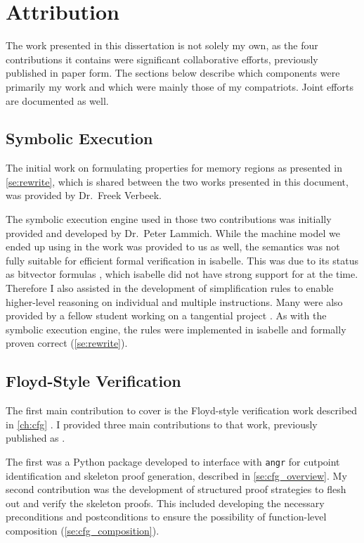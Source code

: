 \chapter{Attribution}\label{attribution}
The work presented in this dissertation is not solely my own,
as the four contributions it contains were significant collaborative efforts, previously published in paper form.
The sections below describe which components were primarily my work
and which were mainly those of my compatriots.
Joint efforts are documented as well.

\section*{Symbolic Execution}
The initial work on formulating properties for memory regions
as presented in \cref{se:rewrite},
which is shared between the two works presented in this document,
was provided by Dr.~Freek Verbeek.

The symbolic execution engine used in those two contributions was initially provided and developed by Dr.~Peter Lammich.
While the machine model we ended up using in the work was provided to us as well,
the semantics was not fully suitable for efficient formal verification in \gls{isabelle}.
This was due to its status as bitvector formulas \autocite{roessle2019verified}, which \gls{isabelle} did not have strong support for at the time.
Therefore I also assisted in the development of simplification rules
to enable higher-level reasoning on individual and multiple instructions.
Many were also provided by a fellow student working on a tangential project \autocite{verbeek2019refinement}.
As with the symbolic execution engine, the rules were implemented in \gls{isabelle} and formally proven correct (\cref{se:rewrite}).

\section*{Floyd-Style Verification}\label{attribute1}
The first main contribution to cover is the Floyd-style verification work described in \cref{ch:cfg} \autocite{bockenek2019preservation}.
I provided three main contributions to that work, previously published as .

The first was a Python package developed to interface with \texttt{angr}
\autocite{shoshitaishvili2016state}
for cutpoint identification and skeleton proof generation,
described in \cref{se:cfg_overview}.
My second contribution was the development of structured proof strategies to flesh out and verify the skeleton proofs.
This included developing the necessary preconditions and postconditions to ensure the possibility of function-level composition (\cref{se:cfg_composition}).


